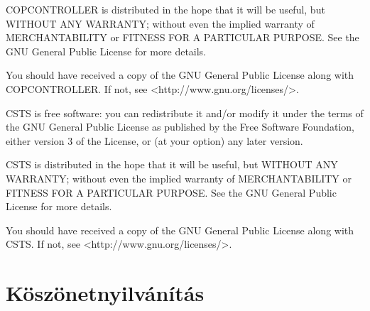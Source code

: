 \documentclass[a4paper,12pt]{report}
\begin{document}
\noindent
COPCONTROLLER is distributed in the hope that it will be useful,
but WITHOUT ANY WARRANTY; without even the implied warranty of
MERCHANTABILITY or FITNESS FOR A PARTICULAR PURPOSE.  See the
GNU General Public License for more details.

\noindent
You should have received a copy of the GNU General Public License
along with COPCONTROLLER. If not, see <http://www.gnu.org/licenses/>.

\noindent
CSTS is free software: you can redistribute it and/or modify
it under the terms of the GNU General Public License as published by
the Free Software Foundation, either version 3 of the License, or
(at your option) any later version.

\noindent
CSTS is distributed in the hope that it will be useful,
but WITHOUT ANY WARRANTY; without even the implied warranty of
MERCHANTABILITY or FITNESS FOR A PARTICULAR PURPOSE.  See the
GNU General Public License for more details.

\noindent
You should have received a copy of the GNU General Public License
along with CSTS. If not, see <http://www.gnu.org/licenses/>.



\chapter*{Köszönetnyilvánítás}
\end{document}
